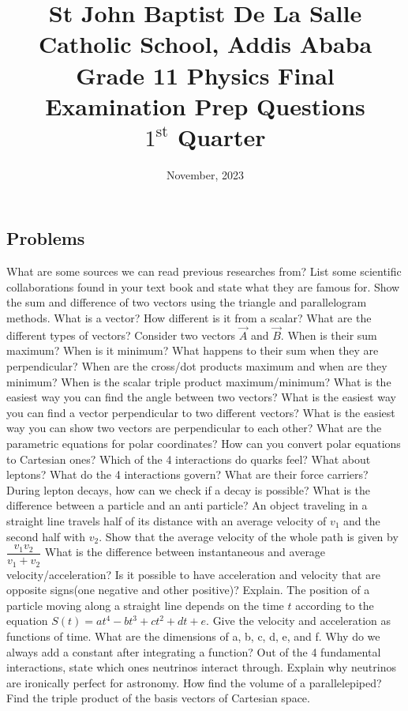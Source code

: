 \documentclass[12pt,addpoints]{exam}
\date{November, 2023}
\begin{document}
	\title{St John Baptist De La Salle Catholic School, Addis Ababa\\
		\large Grade 11 Physics Final Examination Prep Questions\\
		$1^\text{st}$ Quarter}
	\maketitle
	\subsection*{Problems}
				\begin{questions}
					\question What are some sources we can read previous researches from?
					\question List some scientific collaborations found in your text book and state what they are famous for.
					\question Show the sum and difference of two vectors using the triangle and parallelogram methods.
					\question What is a vector? How different is it from a scalar? What are the different types of vectors?
					\question Consider two vectors $\vec{A}$ and $\vec{B}$. When is their sum maximum? When is it minimum? What happens to their sum when they are perpendicular? When are the cross/dot products maximum and when are they minimum? When is the scalar triple product maximum/minimum?
					\question What is the easiest way you can find the angle between two vectors? 
					\question What is the easiest way you can find a vector perpendicular to two different vectors?
					\question What is the easiest way you can show two vectors are perpendicular to each other?
					\question What are the parametric equations for polar coordinates?
					\question How can you convert polar equations to Cartesian ones?
					\question Which of the 4 interactions do quarks feel? What about leptons?
					\question What do the 4 interactions govern? What are their force carriers?
					\question During lepton decays, how can we check if a decay is possible?
					\question What is the difference between a particle and an anti particle?
					\question An object traveling in a straight line travels half of its distance with an average velocity of $v_1$ and the second half with $v_2$. Show that the average velocity of the whole path is given by $\dfrac{v_1v_2}{v_1+v_2}$
					\question What is the difference between instantaneous and average velocity/acceleration?
					\question Is it possible to have acceleration and velocity that are opposite signs(one negative and other positive)? Explain. 
					\question The position of a particle moving along a straight line depends on the time $t$ according to the equation $S(t) = at^4-bt^3+ct^2+dt+e$. Give the velocity and acceleration as functions of time. What are the dimensions of a, b, c, d, e, and f.
					\question Why do we always add a constant after integrating a function?
					\question[1] Out of the 4 fundamental interactions, state which ones neutrinos interact through. Explain why neutrinos are ironically perfect for astronomy. \vspace{1.5in}
					\question How find the volume of a parallelepiped?
					\question Find the triple product of the basis vectors of Cartesian space.
				\end{questions}
			
\end{document}
